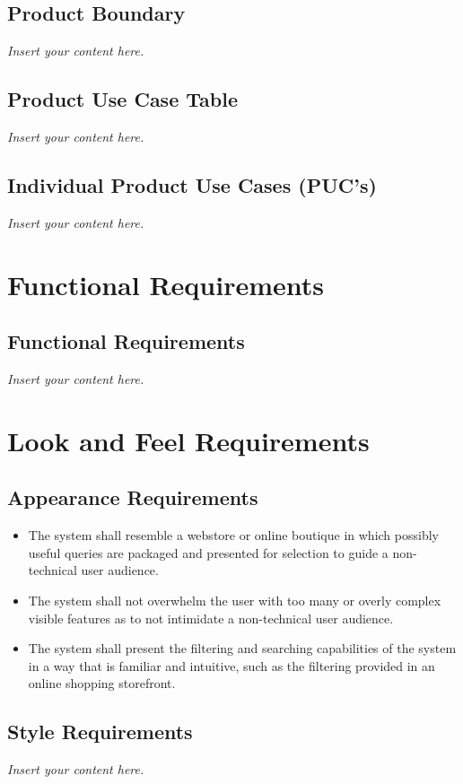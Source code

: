\documentclass[12pt]{article}
\newcommand{\lips}{\textit{Insert your content here.}}
\begin{document}
\subsection{Product Boundary}
\lips
\subsection{Product Use Case Table}
\lips
\subsection{Individual Product Use Cases (PUC's)}
\lips

\section{Functional Requirements}
\subsection{Functional Requirements}
\lips

\section{Look and Feel Requirements}



\subsection{Appearance Requirements}

\begin{itemize}
    \item The system shall resemble a webstore or online boutique in which possibly useful queries are packaged and presented for selection to guide 
    a non-technical user audience.
    \item The system shall not overwhelm the user with too many or overly complex visible features as to not intimidate a non-technical user audience.
    \item The system shall present the filtering and searching capabilities of the system in a way that is familiar and intuitive, such as the 
    filtering provided in an online shopping storefront.
\end{itemize}

\subsection{Style Requirements}
\lips
\end{document}
